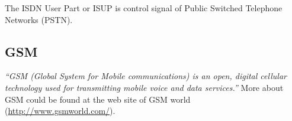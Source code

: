 The ISDN User Part or ISUP is control signal of Public Switched Telephone Networks (PSTN).

\subsection*{GSM}
\label{sym:GSM} 
\label{sec:GSM}

\textit{``GSM (Global System for Mobile communications) is an open, digital cellular technology used for transmitting mobile voice and data services.''} \cite{GSMTheTechnology} More about GSM could be found at the web site of GSM world (\href{http://www.gsmworld.com/}{http://www.gsmworld.com/}). 


